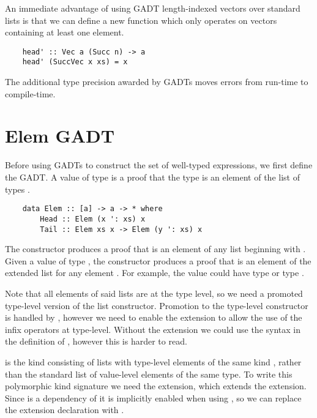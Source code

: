 An immediate advantage of using GADT length-indexed vectors over standard lists is that we can define a new function  which only operates on vectors containing at least one element. 

\begin{lstlisting}
    head' :: Vec a (Succ n) -> a
    head' (SuccVec x xs) = x
\end{lstlisting}

The additional type precision awarded by GADTs moves errors from run-time to compile-time.


\section{Elem GADT}

Before using GADTs to construct the set of well-typed expressions, we first define the  GADT. A value of type  is a proof that the type  is an element of the list of types . 

\begin{lstlisting}
    data Elem :: [a] -> a -> * where
        Head :: Elem (x ': xs) x
        Tail :: Elem xs x -> Elem (y ': xs) x
\end{lstlisting}
\cite{GADTs}

The  constructor produces a proof that  is an element of any list beginning with . Given a value of type , the  constructor produces a proof that  is an element of the extended list  for any element . For example, the value  could have type  or type . 

Note that all elements of said lists are at the type level, so we need a promoted type-level version of the \code{(:)} list constructor. Promotion to the type-level constructor  is handled by , however we need to enable the  extension to allow the use of the infix operators at type-level. Without the  extension we could use the syntax  in the definition of , however this is harder to read.

\code{[a]} is the kind consisting of lists with type-level elements of the same kind , rather than the standard list of value-level elements of the same type. To write this polymorphic kind signature we need the  extension, which extends the  extension. Since  is a dependency of  it is implicitly enabled when using , so we can replace the  extension declaration with .

